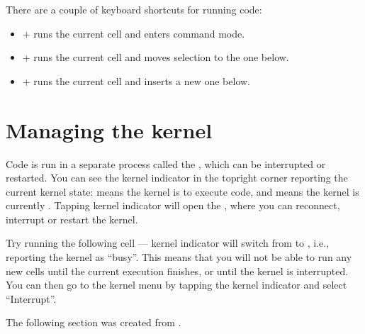 \documentclass[letterpaper,10pt,english]{sphinxmanual}
\begin{document}
\sphinxAtStartPar
There are a couple of keyboard shortcuts for running code:
\begin{itemize}
\item {} 
\sphinxAtStartPar
{}+ runs the current cell and enters command mode.

\item {} 
\sphinxAtStartPar
{}+ runs the current cell and moves selection to the one below.

\item {} 
\sphinxAtStartPar
{}+ runs the current cell and inserts a new one below.

\end{itemize}


\section{Managing the kernel}
\label{\detokenize{notebooks/Intro/NotebookEditor:Managing-the-kernel}}
\sphinxAtStartPar
Code is run in a separate process called the , which can be interrupted or restarted. You can see the kernel indicator in the top\sphinxhyphen{}right corner reporting the current kernel state:  means the kernel is  to execute code, and  means the kernel is currently . Tapping kernel indicator will open the , where you can reconnect, interrupt or restart the kernel.

\sphinxAtStartPar
Try running the following cell — kernel indicator will switch from  to , i.e., reporting the kernel as “busy”. This means that you will not be able to run any new cells until the current execution finishes, or until the kernel is interrupted. You can then go to the kernel menu by tapping the kernel indicator and select “Interrupt”.

\sphinxAtStartPar
The following section was created from .
\end{document}
